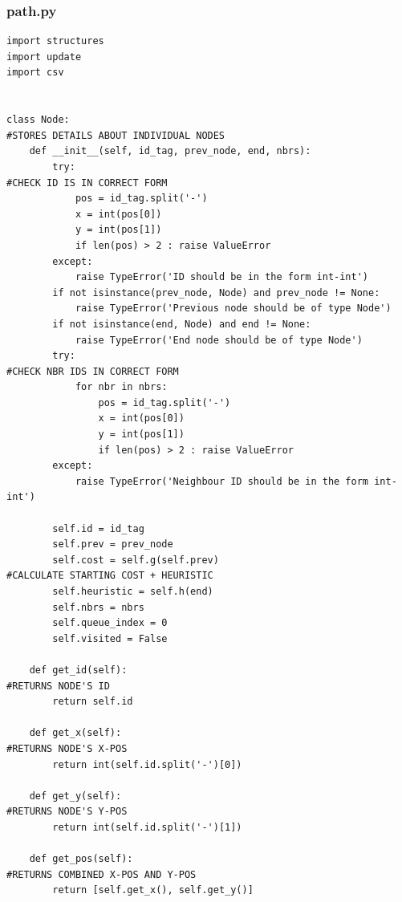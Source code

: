 \documentclass[titlepage]{article}
\begin{document}
\pagebreak
\subsubsection{path.py}
\begin{changemargin}{-1in}{-1in} 
\begin{verbatim}
import structures
import update
import csv


class Node:                                                                     #STORES DETAILS ABOUT INDIVIDUAL NODES
    def __init__(self, id_tag, prev_node, end, nbrs):
        try:                                                                    #CHECK ID IS IN CORRECT FORM
            pos = id_tag.split('-')
            x = int(pos[0])
            y = int(pos[1])
            if len(pos) > 2 : raise ValueError
        except:
            raise TypeError('ID should be in the form int-int')
        if not isinstance(prev_node, Node) and prev_node != None:
            raise TypeError('Previous node should be of type Node')
        if not isinstance(end, Node) and end != None:
            raise TypeError('End node should be of type Node')
        try:                                                                    #CHECK NBR IDS IN CORRECT FORM
            for nbr in nbrs:
                pos = id_tag.split('-')
                x = int(pos[0])
                y = int(pos[1])
                if len(pos) > 2 : raise ValueError
        except:
            raise TypeError('Neighbour ID should be in the form int-int')

        self.id = id_tag
        self.prev = prev_node
        self.cost = self.g(self.prev)                                           #CALCULATE STARTING COST + HEURISTIC
        self.heuristic = self.h(end)
        self.nbrs = nbrs
        self.queue_index = 0
        self.visited = False

    def get_id(self):                                                           #RETURNS NODE'S ID
        return self.id

    def get_x(self):                                                            #RETURNS NODE'S X-POS
        return int(self.id.split('-')[0])

    def get_y(self):                                                            #RETURNS NODE'S Y-POS
        return int(self.id.split('-')[1])

    def get_pos(self):                                                          #RETURNS COMBINED X-POS AND Y-POS
        return [self.get_x(), self.get_y()]


\end{verbatim}
\end{changemargin}
\end{document}
